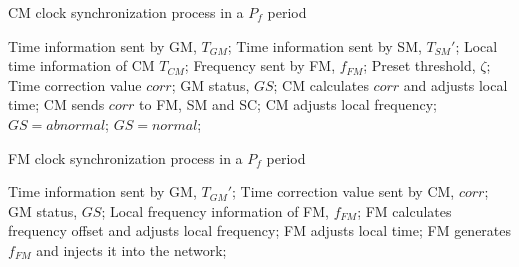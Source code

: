 \documentclass[conference]{IEEEtran}
\begin{document}
\begin{algorithm}[ht]  
	\caption{CM clock synchronization process in a $P_f$ period}  
	\begin{algorithmic}[1]
		\REQUIRE Time information sent by GM, $T_{GM}$; Time information sent by SM, $T_{SM}'$; Local time information of CM $T_{CM}$; Frequency sent by FM, $f_{FM}$; Preset threshold, $\zeta$;
		\ENSURE Time correction value $corr$; GM status, $GS$;
				\STATE CM calculates $corr$ and adjusts local time;  
				\STATE CM sends $corr$ to FM, SM and SC;
						\STATE CM adjusts local frequency;
					\ENDIF
					\STATE $GS = abnormal$;
						\STATE $GS = normal$;
					\ENDIF
				\ENDIF
			\ENDWHILE
		\ENDWHILE
	\end{algorithmic}
\end{algorithm}


\begin{algorithm}[ht]  
	\caption{FM clock synchronization process in a $P_f$ period}  
	\begin{algorithmic}[1]
		\REQUIRE Time information sent by GM, $T_{GM}'$; Time correction value sent by CM, $corr$; GM status, $GS$;
		\ENSURE Local frequency information of FM, $f_{FM}$;
		\REPEAT
		\STATE FM calculates frequency offset and adjusts local frequency;
		\ENDIF
		\STATE FM adjusts local time;
		\ENDIF
		\ENDIF
		\STATE FM generates $f_{FM}$ and injects it into the network;
		\ENDWHILE
	\end{algorithmic}
\end{algorithm}

\end{document}
